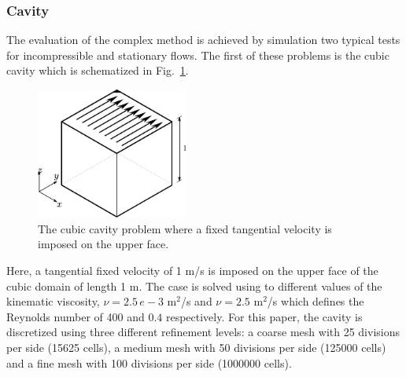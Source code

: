 \documentclass[final,3p,times,11pt,onecolumn]{myElsarticle}
\numberwithin{equation}{section}
\begin{document}
\subsubsection{Cavity}
The evaluation of the complex method is achieved by simulation  two typical tests for incompressible and stationary flows. The first of these problems is the cubic cavity which is schematized in Fig.~\ref{Fig:Cavity}.
\begin{figure}[t!]
\centering
\includegraphics[width=5cm]{fig/Cases/Cavity.pdf}
\caption{The cubic cavity problem where a fixed tangential velocity is imposed on the upper face.}
\label{Fig:Cavity}
\end{figure} 
Here, a tangential fixed velocity of 1 m/s is imposed on the upper face of the cubic domain of length 1 m. The case is solved using to different values of the kinematic viscosity, $\nu = 2.5\, e-3$ m$^2$/s and $\nu = 2.5$ m$^2$/s which defines the Reynolds number of 400 and $0.4$ respectively. For this paper, the cavity is discretized using three different refinement levels: a coarse mesh with 25 divisions per side (15625 cells), a medium mesh with 50 divisions per side (125000 cells) and a fine mesh with 100 divisions per side (1000000 cells).
\end{document}
